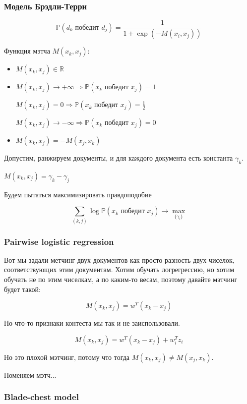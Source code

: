 \documentclass[12pt]{article}
\begin{document}
\subsubsection*{Модель Брэдли-Терри}

\[ \mathbb{P}(d_k \text{  победит  } d_j) = \frac{1}{1+\exp(- M(x_i, x_j))} \]

Функция мэтча $M(x_k, x_j)$:
\begin{itemize}
\item $M(x_k, x_j) \in \mathbb{R}$
\item $M(x_k, x_j) \rightarrow +\infty \Rightarrow \mathbb{P} (x_k \text{  победит  } x_j) = 1$

$M(x_k, x_j) = 0 \Rightarrow \mathbb{P} (x_k \text{  победит  } x_j) = \frac{1}{2}$

$M(x_k, x_j) \rightarrow -\infty \Rightarrow \mathbb{P} (x_k \text{  победит  } x_j) = 0$
\item $M(x_k, x_j) = -M(x_j, x_k)$
\end{itemize}

Допустим, ранжируем документы, и для каждого документа есть константа $\gamma_k$.

$M(x_k, x_j) = \gamma_k - \gamma_j$

Будем пытаться максимизировать правдоподобие 

\[ \sum_{(k, j)} \log \mathbb{P} (x_k \text{  победит  } x_j) \rightarrow \max_{\{\gamma_l\}} \]

\subsubsection*{Pairwise logistic regression}

Вот мы задали метчинг двух документов как просто разность двух чиселок, соответствующих этим документам. Хотим обучать логрегрессию, но хотим обучать не по этим чиселкам, а по каким-то весам, поэтому давайте мэтчинг будет такой:

\[ M(x_k, x_j) = w^T (x_k - x_j) \]

Но что-то признаки контеста мы так и не заиспользовали.


\[ M(x_k, x_j) = w^T (x_k - x_j) + w_i^Tz_i \]

Но это плохой мэтчинг, потому что тогда $M(x_k, x_j) \neq M(x_j, x_k)$.

Поменяем мэтч...

\subsubsection*{Blade-chest model}
\end{document}
